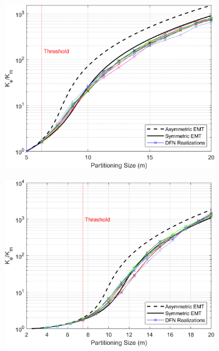 \documentclass[Supplementary.tex]{subfiles}
\begin{document}
\begin{figure}[ht]
\begin{subfigure}{0.3\textwidth}
        \includegraphics[width=\textwidth]{FSU/Plot_FSU_Case_05_nohead.png}
        \label{fig:FSU_5}
    \end{subfigure}
    \begin{subfigure}{0.3\textwidth}
        \includegraphics[width=\textwidth]{FSU/Plot_FSU_Case_06_nohead.png}
        \label{fig:FSU_6}
    \end{subfigure}
    \\
    \begin{subfigure}{0.3\textwidth}

\end{subfigure}
\end{figure}
\end{document}
